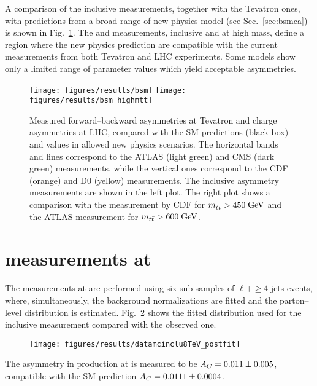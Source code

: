 A comparison of the inclusive \ac{} measurements, together with the Tevatron
\afb{} ones, with predictions from a broad range of new physics model
(see Sec.~\ref{sec:bsmca}) is shown in Fig.~\ref{fig:summarybsm}. The
\ac{} and \afb{} measurements, inclusive and at high \mtt{} mass,
define a region where the new physics prediction are compatible with
the current measurements from both Tevatron and LHC experiments.
Some models show only a limited range of parameter values which yield
acceptable asymmetries.

\begin{figure}[!htb]
  \centering
  \texttt{[image: figures/results/bsm]}
  \texttt{[image: figures/results/bsm\_highmtt]}
  \caption{Measured forward--backward asymmetries \afb{} at Tevatron
    and charge asymmetries \ac{} at LHC, compared with the SM
    predictions (black box) and values in allowed new physics
    scenarios. The horizontal bands and lines correspond to the ATLAS
    (light green) and CMS (dark green) measurements, while the
    vertical ones correspond to the CDF (orange) and D0 (yellow)
    measurements. The inclusive asymmetry measurements are shown in
    the left plot. The right plot shows a comparison with the \afb{}
    measurement by CDF for $m_{t\bar{t}}{} > 450 \; \mathrm{GeV}{}$ and the ATLAS \ac{}
    measurement for $m_{t\bar{t}}{} > 600 \; \mathrm{GeV}{}$.}
  \label{fig:summarybsm}
\end{figure}


\section{\ac{} measurements at \eighttev{}}
\label{sec:res8tev}

The measurements at \eighttev{} are performed using six sub-samples of
$\ell{}+\ge4$ jets events, where, simultaneously, the background
normalizations are fitted and the parton--level \dy{} distribution is
estimated. Fig.~\ref{fig:dy7tev} shows the fitted distribution used
for the inclusive \ac{} measurement compared with the observed one. 
\begin{figure}[!htb]\centering
  \texttt{[image: figures/results/datamcinclu8TeV\_postfit]} 
  \caption{}
  \label{fig:dy7tev}
\end{figure}
The asymmetry \ac{} in \ttbar{} production at \eighttev{} is measured to be
$A_C{}= 0.011\pm0.005$, compatible with the SM prediction
$A_C{}=0.0111\pm0.0004$.

